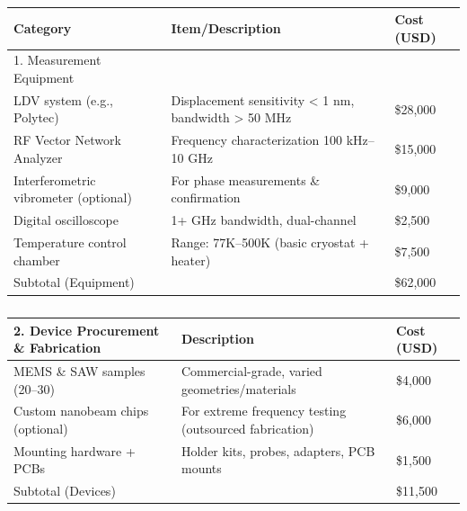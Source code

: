 \documentclass[11pt]{article}
\begin{document}
\begin{table}
    \footnotesize
    \centering
    \begin{tabular}{lll}
        \toprule
        \textbf{Category} & \textbf{Item/Description} & \textbf{Cost (USD)} \\
        \midrule
        1. Measurement Equipment &  &  \\
        LDV system (e.g., Polytec) & Displacement sensitivity < 1 nm, bandwidth > 50 MHz & \$28,000 \\
        RF Vector Network Analyzer & Frequency characterization 100 kHz–10 GHz & \$15,000 \\
        Interferometric vibrometer (optional) & For phase measurements \& confirmation & \$9,000 \\
        Digital oscilloscope &  1+ GHz bandwidth, dual-channel & \$2,500 \\
        Temperature control chamber & Range: 77K–500K (basic cryostat + heater) & \$7,500 \\
        Subtotal (Equipment) &  & \$62,000 \\
        \bottomrule
    \end{tabular}
    \caption{}
    \label{tab:equipment}
\end{table}


\begin{table}
    \footnotesize
        \centering
        \begin{tabular}{lll}
            \toprule
            \textbf{2. Device Procurement \& Fabrication} & \textbf{Description} & \textbf{Cost (USD)} \\
            \midrule
            MEMS \& SAW samples (20–30) & Commercial-grade, varied geometries/materials & \$4,000 \\
            Custom nanobeam chips (optional) & For extreme frequency testing (outsourced fabrication) & \$6,000 \\
            Mounting hardware + PCBs & Holder kits, probes, adapters, PCB mounts & \$1,500 \\
            Subtotal (Devices) &  & \$11,500 \\
            \bottomrule
        \end{tabular}
        \caption{}
        \label{tab:devices}
\end{table}
\end{document}
